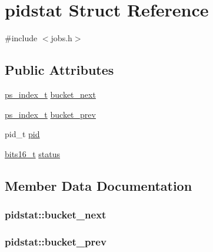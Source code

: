 \hypertarget{structpidstat}{}\section{pidstat Struct Reference}
\label{structpidstat}


{\ttfamily \#include $<$jobs.\+h$>$}

\subsection*{Public Attributes}
\begin{DoxyCompactItemize}
\item 
\hyperlink{jobs_8h_a677d6488545fa3193e7cb54647b4ae5c}{ps\+\_\+index\+\_\+t} \hyperlink{structpidstat_a6848a528a59f93911847b61d0b329ee5}{bucket\+\_\+next}
\item 
\hyperlink{jobs_8h_a677d6488545fa3193e7cb54647b4ae5c}{ps\+\_\+index\+\_\+t} \hyperlink{structpidstat_a5b7cfb7d4d5f30b11eaa92db21ec71a0}{bucket\+\_\+prev}
\item 
pid\+\_\+t \hyperlink{structpidstat_a9720eaa7788ca953a6130f2b8d1d1a23}{pid}
\item 
\hyperlink{config_8h_a843210b77ffdc4d44cf0ec069877735a}{bits16\+\_\+t} \hyperlink{structpidstat_a7feadc8da0ca4c76cd76c3b97274e622}{status}
\end{DoxyCompactItemize}


\subsection{Member Data Documentation}
\subsubsection[{\texorpdfstring{bucket\+\_\+next}{bucket_next}}]{ pidstat\+::bucket\+\_\+next}\hypertarget{structpidstat_a6848a528a59f93911847b61d0b329ee5}{}\label{structpidstat_a6848a528a59f93911847b61d0b329ee5}
\subsubsection[{\texorpdfstring{bucket\+\_\+prev}{bucket_prev}}]{ pidstat\+::bucket\+\_\+prev}\hypertarget{structpidstat_a5b7cfb7d4d5f30b11eaa92db21ec71a0}{}\label{structpidstat_a5b7cfb7d4d5f30b11eaa92db21ec71a0}
